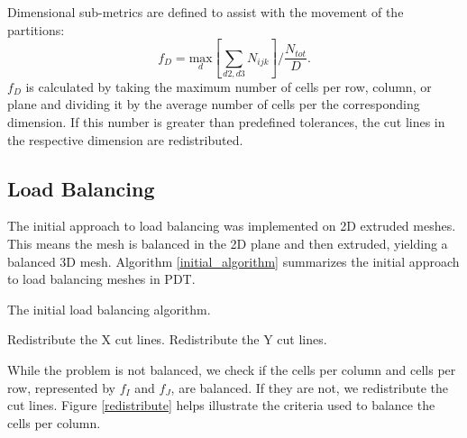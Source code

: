 \documentclass[11pt, letterpaper,titlepage,oneside]{article}
\begin{document}
Dimensional sub-metrics are defined to assist with the movement of the partitions:
\begin{equation}
f_{D} = \underset{d}{\text{max}}[\sum_{d2,d3} N_{ijk}]/\frac{N_{tot}}{D}.
\end{equation}
$f_{D}$ is calculated by taking the maximum number of cells per row, column, or plane and dividing it by the average number of cells per the corresponding dimension. If this number is greater than predefined tolerances, the cut lines in the respective dimension are redistributed. 

\subsection{Load Balancing}

The initial approach to load balancing was implemented on 2D extruded meshes. This means the mesh is balanced in the 2D plane and then extruded, yielding a balanced 3D mesh. Algorithm \ref{initial_algorithm} summarizes the initial approach to load balancing meshes in PDT.

\begin{algorithm}[H]
\caption{The initial load balancing algorithm.}
\label{initial_algorithm}
\begin{algorithmic}

    \STATE Redistribute the X cut lines.
  \ENDIF
  	\STATE Redistribute the Y cut lines.
  \ENDIF
\ENDWHILE
\end{algorithmic}
\end{algorithm}

While the problem is not balanced, we check if the cells per column and cells per row, represented by $f_I$ and $f_J$, are balanced. If they are not, we redistribute the cut lines. Figure \ref{redistribute} helps illustrate the criteria used to balance the cells per column. 
\end{document}
